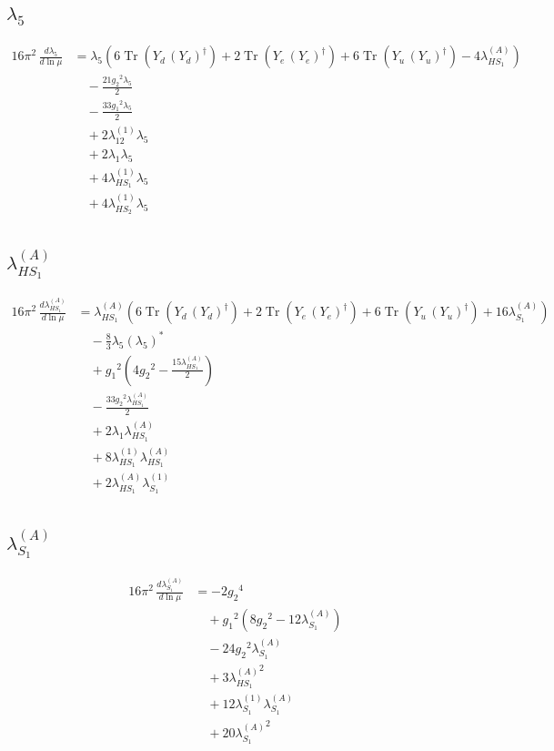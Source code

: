 \documentclass[10pt,a4paper]{article}
\begin{document}
\subsection*{$\lambda_5$}
\begin{align*}
16\pi^2\,\frac{d \lambda_5}{d\ln\mu} &={\lambda_5} (6 \operatorname{Tr}\!\left({Y_d}\,\left({Y_d}\right)^{\dagger}\right)+2 \operatorname{Tr}\!\left({Y_e}\,\left({Y_e}\right)^{\dagger}\right)+6 \operatorname{Tr}\!\left({Y_u}\,\left({Y_u}\right)^{\dagger}\right)-4 {\lambda_{HS_1}^{(A)}}) \\
&\quad -\frac{21 {g_2}^2 {\lambda_5}}{2} \\
&\quad -\frac{33 {g_1}^2 {\lambda_5}}{2} \\
&\quad +2 {\lambda_{12}^{(1)}} {\lambda_5} \\
&\quad +2 {\lambda_1} {\lambda_5} \\
&\quad +4 {\lambda_{HS_1}^{(1)}} {\lambda_5} \\
&\quad +4 {\lambda_{HS_2}^{(1)}} {\lambda_5} \\
\end{align*}
\subsection*{$\lambda_{HS_1}^{(A)}$}
\begin{align*}
16\pi^2\,\frac{d \lambda_{HS_1}^{(A)}}{d\ln\mu} &={\lambda_{HS_1}^{(A)}} (6 \operatorname{Tr}\!\left({Y_d}\,\left({Y_d}\right)^{\dagger}\right)+2 \operatorname{Tr}\!\left({Y_e}\,\left({Y_e}\right)^{\dagger}\right)+6 \operatorname{Tr}\!\left({Y_u}\,\left({Y_u}\right)^{\dagger}\right)+16 {\lambda_{S_1}^{(A)}}) \\
&\quad -\frac{8}{3} {\lambda_5} \left({\lambda_5}\right)^{*} \\
&\quad +{g_1}^2 \left(4 {g_2}^2-\frac{15 {\lambda_{HS_1}^{(A)}}}{2}\right) \\
&\quad -\frac{33 {g_2}^2 {\lambda_{HS_1}^{(A)}}}{2} \\
&\quad +2 {\lambda_1} {\lambda_{HS_1}^{(A)}} \\
&\quad +8 {\lambda_{HS_1}^{(1)}} {\lambda_{HS_1}^{(A)}} \\
&\quad +2 {\lambda_{HS_1}^{(A)}} {\lambda_{S_1}^{(1)}} \\
\end{align*}
\subsection*{$\lambda_{S_1}^{(A)}$}
\begin{align*}
16\pi^2\,\frac{d \lambda_{S_1}^{(A)}}{d\ln\mu} &=-2 {g_2}^4 \\
&\quad +{g_1}^2 \left(8 {g_2}^2-12 {\lambda_{S_1}^{(A)}}\right) \\
&\quad -24 {g_2}^2 {\lambda_{S_1}^{(A)}} \\
&\quad +3 {\lambda_{HS_1}^{(A)}}^2 \\
&\quad +12 {\lambda_{S_1}^{(1)}} {\lambda_{S_1}^{(A)}} \\
&\quad +20 {\lambda_{S_1}^{(A)}}^2 \\
\end{align*}
\end{document}
